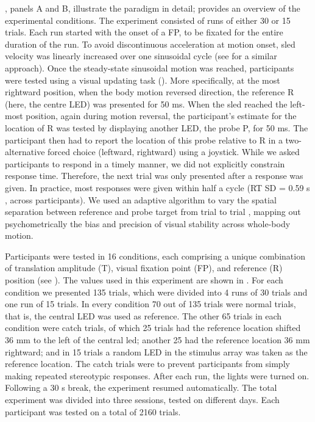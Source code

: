 , panels A and B, illustrate the paradigm in detail;  provides an overview of the experimental conditions. The experiment consisted of runs of either 30 or 15 trials. Each run started with the onset of a FP, to be fixated for the entire duration of the run. To avoid discontinuous acceleration at motion onset, sled velocity was linearly increased over one sinusoidal cycle (see  for a similar approach). Once the steady-state sinusoidal motion was reached, participants were tested using a visual updating task (). More specifically, at the most rightward position, when the body motion reversed direction, the reference R (here, the centre LED) was presented for 50 \si{\milli\second}. When the sled reached the left-most position, again during motion reversal, the participant's estimate for the location of R was tested by displaying another LED, the probe P, for 50 \si{\milli\second}. The participant then had to report the location of this probe relative to R in a two-alternative forced choice (leftward, rightward) using a joystick. While we asked participants to respond in a timely manner, we did not explicitly constrain response time. Therefore, the next trial was only presented after a response was given. In practice, most responses were given within half a cycle (RT {\textpm}SD = 0.59 \si{\second} , across participants). We used an adaptive algorithm to vary the spatial separation between reference and probe target from trial to trial \cite{kontsevich1999}, mapping out psychometrically the bias and precision of visual stability across whole-body motion.

Participants were tested in 16 conditions, each comprising a unique combination of translation amplitude (T), visual fixation point (FP), and reference (R) position (see ). The values used in this experiment are shown in . For each condition we presented 135 trials, which were divided into 4 runs of 30 trials and one run of 15 trials. In every condition 70 out of 135 trials were normal trials, that is, the central LED was used as reference. The other 65 trials in each condition were catch trials, of which 25 trials had the reference location shifted 36 mm to the left of the central led; another 25 had the reference location 36 \si{\milli\metre} rightward; and in 15 trials a random LED in the stimulus array was taken as the reference location. The catch trials were to prevent participants from simply making repeated stereotypic responses. After each run, the lights were turned on. Following a 30 s break, the experiment resumed automatically. The total experiment was divided into three sessions, tested on different days.  Each participant was tested on a total of 2160 trials.

